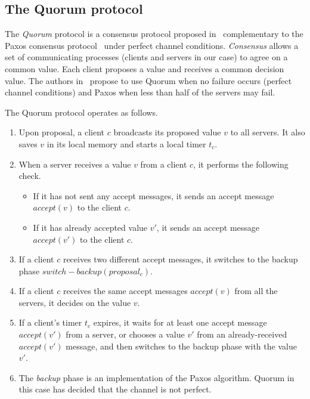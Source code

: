 \subsection{The Quorum protocol}
\label{subsec:quorum}
%
The \emph{Quorum} protocol is a consensus protocol proposed in~\cite{guerraoui2012speculative}
complementary to the Paxos consensus protocol~\cite{gafni2003disk} under perfect
channel conditions. {\em Consensus} allows a set of communicating processes
(clients and servers in our case) to agree on a common value. Each client proposes
a value and receives a common decision value. The authors in~\cite{guerraoui2012speculative}
propose to use Quorum when no failure occurs (perfect channel conditions) and 
Paxos when less than half of the servers may fail. 

The Quorum protocol operates as follows.
\begin{enumerate}
 \item Upon proposal, a client $c$ broadcasts its proposed value 
 $v$ to all servers. It also saves $v$ in its local memory and starts a local timer
 $t_c$. 
 \item When a server receives a value $v$ from a client $c$, it performs
 the following check.
 \begin{itemize}
  \item If it has not sent any accept messages, it sends an accept message
  $\mathit{accept}(v)$ to the client $c$. 
  \item If it has already accepted value $v'$, it sends an accept message
  $\mathit{accept}(v')$ to the client $c$. 
 \end{itemize}
 \item If a client $c$ receives two different accept messages, it switches
 to the backup phase $\mathit{switch-backup}(\mathit{proposal_c})$.
 \item If a client $c$ receives the same accept messages $\mathit{accept}(v)$ from all the servers,
 it decides on the value $v$.
 \item If a client's timer $t_c$ expires, it waits for at least
 one accept message $\mathit{accept}(v')$ from a server, or chooses a value $v'$
 from an already-received $\mathit{accept}(v')$ message, and then switches to 
 the backup phase with the value $v'$. 
 \item
 The {\em backup} phase is an implementation of the Paxos algorithm. Quorum in this case has decided that the channel is not perfect. 
\end{enumerate}

